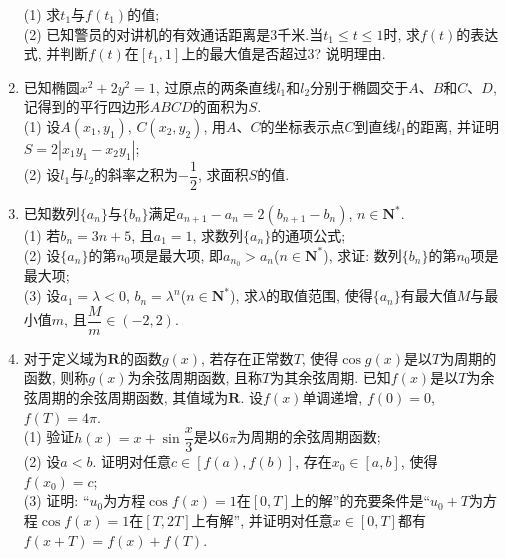 \documentclass[10pt,a4paper]{article}
\begin{document}
\begin{enumerate}[1.]
\begin{center}
\end{center}
(1) 求$t_1$与$f(t_1)$的值;\\
(2) 已知警员的对讲机的有效通话距离是$3$千米.当$t_1\le t\le 1$时, 求$f(t)$的表达式, 并判断$f(t)$在$[t_1,1]$上的最大值是否超过$3$? 说明理由.
\item 已知椭圆$x^2+2y^2=1$, 过原点的两条直线$l_1$和$l_2$分别于椭圆交于$A$、$B$和$C$、$D$, 记得到的平行四边形$ABCD$的面积为$S$.\\
(1) 设$A(x_1,y_1)$, $C(x_2,y_2)$, 用$A$、$C$的坐标表示点$C$到直线$l_1$的距离, 并证明$S=2|x_1y_1-x_2y_1|$;\\
(2) 设$l_1$与$l_2$的斜率之积为$-\dfrac 12$, 求面积$S$的值.
\item 已知数列$\{a_n\}$与$\{b_n\}$满足$a_{n+1}-a_n=2(b_{n+1}-b_n)$, $n\in \mathbf{N}^*$.\\
(1) 若$b_n=3n+5$, 且$a_1=1$, 求数列$\{a_n\}$的通项公式;\\
(2) 设$\{a_n\}$的第$n_0$项是最大项, 即$a_{n_0}>a_n$($n\in \mathbf{N}^*$), 求证: 数列$\{b_n\}$的第$n_0$项是最大项;\\
(3) 设$a_1=\lambda <0$, $b_n=\lambda ^n$($n\in \mathbf{N}^*$), 求$\lambda$的取值范围, 使得$\{a_n\}$有最大值$M$与最小值$m$, 且$\dfrac M m\in (-2,2)$.
\item 对于定义域为$\mathbf{R}$的函数$g(x)$, 若存在正常数$T$, 使得$\cos g(x)$是以$T$为周期的函数, 则称$g(x)$为余弦周期函数, 且称$T$为其余弦周期. 已知$f(x)$是以$T$为余弦周期的余弦周期函数, 其值域为$\mathbf{R}$. 设$f(x)$单调递增, $f(0)=0$, $f(T)=4\pi$.\\
(1) 验证$h(x)=x+\sin \dfrac x3$是以$6\pi$为周期的余弦周期函数;\\
(2) 设$a<b$. 证明对任意$c\in [f(a),f(b)]$, 存在$x_0\in [a,b]$, 使得$f(x_0)=c$;\\
(3) 证明: ``$u_0$为方程$\cos f(x)=1$在$[0,T]$上的解''的充要条件是``$u_0+T$为方程$\cos f(x)=1$在$[T ,2T]$上有解'', 并证明对任意$x\in [0,T]$都有$f(x+T)=f(x)+f(T)$.



\end{enumerate}
\end{document}
